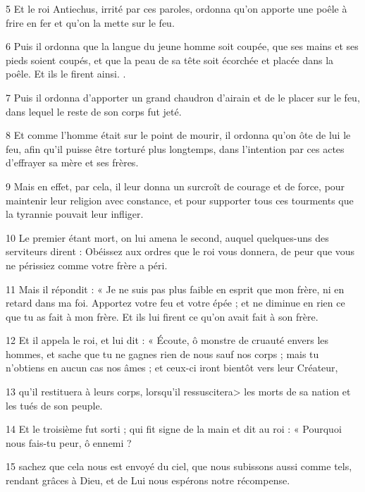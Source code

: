 \par 5 Et le roi Antiechus, irrité par ces paroles, ordonna qu'on apporte une poêle à frire en fer et qu'on la mette sur le feu.

\par 6 Puis il ordonna que la langue du jeune homme soit coupée, que ses mains et ses pieds soient coupés, et que la peau de sa tête soit écorchée et placée dans la poêle. Et ils le firent ainsi. .

\par 7 Puis il ordonna d'apporter un grand chaudron d'airain et de le placer sur le feu, dans lequel le reste de son corps fut jeté.

\par 8 Et comme l'homme était sur le point de mourir, il ordonna qu'on ôte de lui le feu, afin qu'il puisse être torturé plus longtemps, dans l'intention par ces actes d'effrayer sa mère et ses frères.

\par 9 Mais en effet, par cela, il leur donna un surcroît de courage et de force, pour maintenir leur religion avec constance, et pour supporter tous ces tourments que la tyrannie pouvait leur infliger.

\par 10 Le premier étant mort, on lui amena le second, auquel quelques-uns des serviteurs dirent : Obéissez aux ordres que le roi vous donnera, de peur que vous ne périssiez comme votre frère a péri.

\par 11 Mais il répondit : « Je ne suis pas plus faible en esprit que mon frère, ni en retard dans ma foi. Apportez votre feu et votre épée ; et ne diminue en rien ce que tu as fait à mon frère. Et ils lui firent ce qu'on avait fait à son frère.

\par 12 Et il appela le roi, et lui dit : « Écoute, ô monstre de cruauté envers les hommes, et sache que tu ne gagnes rien de nous sauf nos corps ; mais tu n’obtiens en aucun cas nos âmes ; et ceux-ci iront bientôt vers leur Créateur,

\par 13 qu'il restituera à leurs corps, lorsqu'il ressuscitera> les morts de sa nation et les tués de son peuple.

\par 14 Et le troisième fut sorti ; qui fit signe de la main et dit au roi : « Pourquoi nous fais-tu peur, ô ennemi ?

\par 15 sachez que cela nous est envoyé du ciel, que nous subissons aussi comme tels, rendant grâces à Dieu, et de Lui nous espérons notre récompense.

